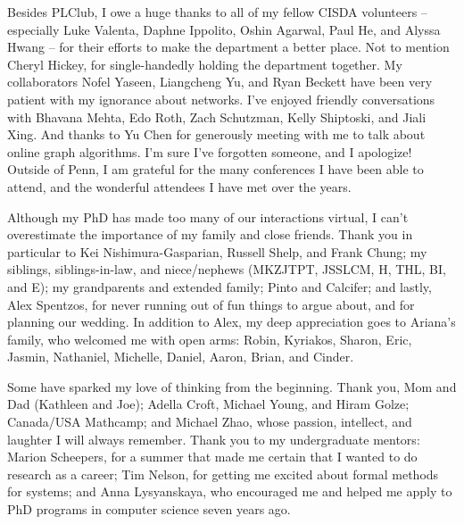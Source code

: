 Besides PLClub, I owe a huge thanks to all of my fellow CISDA volunteers -- especially Luke Valenta, Daphne Ippolito, Oshin Agarwal, Paul He, and Alyssa Hwang -- for their efforts to make the department a better place.
Not to mention Cheryl Hickey, for single-handedly holding the department together.
My collaborators Nofel Yaseen, Liangcheng Yu, and Ryan Beckett have been very patient with my ignorance about networks.
I've enjoyed friendly conversations with Bhavana Mehta, Edo Roth, Zach Schutzman, Kelly Shiptoski, and Jiali Xing.
And thanks to Yu Chen for generously meeting with me to talk about online graph algorithms.
I'm sure I've forgotten someone, and I apologize!
Outside of Penn, I am grateful for the many conferences I have been able to attend, and the wonderful attendees I have met over the years.

Although my PhD has made too many of our interactions virtual, I can't overestimate the importance of my family and close friends.
Thank you in particular to Kei Nishimura-Gasparian, Russell Shelp, and Frank Chung; my siblings, siblings-in-law, and niece/nephews (MKZJTPT, JSSLCM, H, THL, BI, and E); my grandparents and extended family; Pinto and Calcifer;
and lastly, Alex Spentzos, for never running out of fun things to argue about, and for planning our wedding. In addition to Alex, my deep appreciation goes to Ariana's family, who welcomed me with open arms: Robin, Kyriakos, Sharon, Eric, Jasmin, Nathaniel, Michelle, Daniel, Aaron, Brian, and Cinder.

Some have sparked my love of thinking from the beginning.
Thank you, Mom and Dad (Kathleen and Joe);
Adella Croft, Michael Young, and Hiram Golze;
Canada/USA Mathcamp;
and Michael Zhao,
whose passion, intellect, and laughter I will always remember.
Thank you to my undergraduate mentors: Marion Scheepers, for a summer that made me certain that I wanted to do research as a career;
Tim Nelson, for getting me excited about formal methods for systems;
and Anna Lysyanskaya, who encouraged me and helped me apply to PhD programs in computer science seven years ago.

